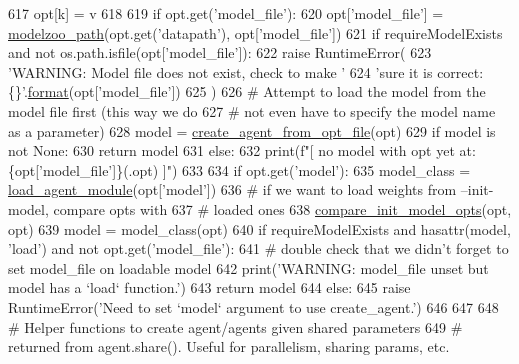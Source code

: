 \begin{DoxyCode}
617                 opt[k] = v
618 
619     \textcolor{keywordflow}{if} opt.get(\textcolor{stringliteral}{'model\_file'}):
620         opt[\textcolor{stringliteral}{'model\_file'}] = \hyperlink{namespaceparlai_1_1agents_1_1legacy__agents_1_1seq2seq_1_1utils__v0_a5fbd3301b67f00d6d146fb01c7cd7626}{modelzoo\_path}(opt.get(\textcolor{stringliteral}{'datapath'}), opt[\textcolor{stringliteral}{'model\_file'}])
621         \textcolor{keywordflow}{if} requireModelExists \textcolor{keywordflow}{and} \textcolor{keywordflow}{not} os.path.isfile(opt[\textcolor{stringliteral}{'model\_file'}]):
622             \textcolor{keywordflow}{raise} RuntimeError(
623                 \textcolor{stringliteral}{'WARNING: Model file does not exist, check to make '}
624                 \textcolor{stringliteral}{'sure it is correct: \{\}'}.\hyperlink{namespaceparlai_1_1chat__service_1_1services_1_1messenger_1_1shared__utils_a32e2e2022b824fbaf80c747160b52a76}{format}(opt[\textcolor{stringliteral}{'model\_file'}])
625             )
626         \textcolor{comment}{# Attempt to load the model from the model file first (this way we do}
627         \textcolor{comment}{# not even have to specify the model name as a parameter)}
628         model = \hyperlink{namespaceparlai_1_1core_1_1agents_a8dcf9aa8caf8fe1046ff4cac7f38b54c}{create\_agent\_from\_opt\_file}(opt)
629         \textcolor{keywordflow}{if} model \textcolor{keywordflow}{is} \textcolor{keywordflow}{not} \textcolor{keywordtype}{None}:
630             \textcolor{keywordflow}{return} model
631         \textcolor{keywordflow}{else}:
632             print(f\textcolor{stringliteral}{"[ no model with opt yet at: \{opt['model\_file']\}(.opt) ]"})
633 
634     \textcolor{keywordflow}{if} opt.get(\textcolor{stringliteral}{'model'}):
635         model\_class = \hyperlink{namespaceparlai_1_1core_1_1loader_a8e6a8f524cba24b80e9bd157c2e0ab8b}{load\_agent\_module}(opt[\textcolor{stringliteral}{'model'}])
636         \textcolor{comment}{# if we want to load weights from --init-model, compare opts with}
637         \textcolor{comment}{# loaded ones}
638         \hyperlink{namespaceparlai_1_1core_1_1agents_a9761bb2314603dd92f5eee786930b21a}{compare\_init\_model\_opts}(opt, opt)
639         model = model\_class(opt)
640         \textcolor{keywordflow}{if} requireModelExists \textcolor{keywordflow}{and} hasattr(model, \textcolor{stringliteral}{'load'}) \textcolor{keywordflow}{and} \textcolor{keywordflow}{not} opt.get(\textcolor{stringliteral}{'model\_file'}):
641             \textcolor{comment}{# double check that we didn't forget to set model\_file on loadable model}
642             print(\textcolor{stringliteral}{'WARNING: model\_file unset but model has a `load` function.'})
643         \textcolor{keywordflow}{return} model
644     \textcolor{keywordflow}{else}:
645         \textcolor{keywordflow}{raise} RuntimeError(\textcolor{stringliteral}{'Need to set `model` argument to use create\_agent.'})
646 
647 
648 \textcolor{comment}{# Helper functions to create agent/agents given shared parameters}
649 \textcolor{comment}{# returned from agent.share(). Useful for parallelism, sharing params, etc.}
\end{DoxyCode}
